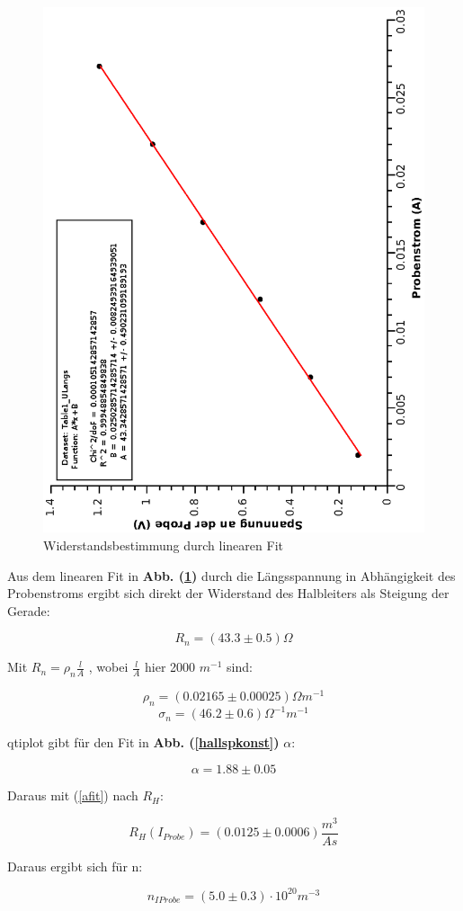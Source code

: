\documentclass[12pt,a4paper,twopage]{article}
\begin{document}
\begin{figure}
\begin{center}

\includegraphics[width=0.4\linewidth, angle=-90]{widerstand.eps}
\caption{Widerstandsbestimmung durch linearen Fit\label{widerstandimg}}
\end{center}
\end{figure}

Aus dem linearen Fit in \textbf{Abb. (\ref{widerstandimg})} durch die Längsspannung in Abhängigkeit des Probenstroms ergibt sich direkt der Widerstand des Halbleiters als Steigung der Gerade:

\begin{center}


$$\boxed{R_n =  (43.3 \pm 0.5) \Omega }$$

Mit $ R_n = \rho_n \frac{l}{A} $ , wobei $\frac{l}{A}$ hier 2000 $m^{-1}$ sind:

$$\rho_n = (0.02165 \pm 0.00025) \Omega m^{-1} $$
$$\boxed{\sigma_n =  (46.2 \pm 0.6) \Omega^{-1}m^{-1} }$$  

\end{center}

qtiplot gibt für den Fit in \textbf{Abb. (\ref{hallspkonst})}  $\alpha$:

$$ \alpha = 1.88 \pm 0.05 $$

Daraus mit (\ref{afit}) nach $R_H$:

\begin{center}
$$ \boxed{ R_H(I_{Probe}) = (0.0125 \pm 0.0006) \frac{m^3}{As} } $$
\end{center}

Daraus ergibt sich für n:

\begin{center}
$$ \boxed{ n_{IProbe} = (5.0 \pm 0.3) \cdot 10^{20} m^{-3} } $$
\end{center}
\end{document}
